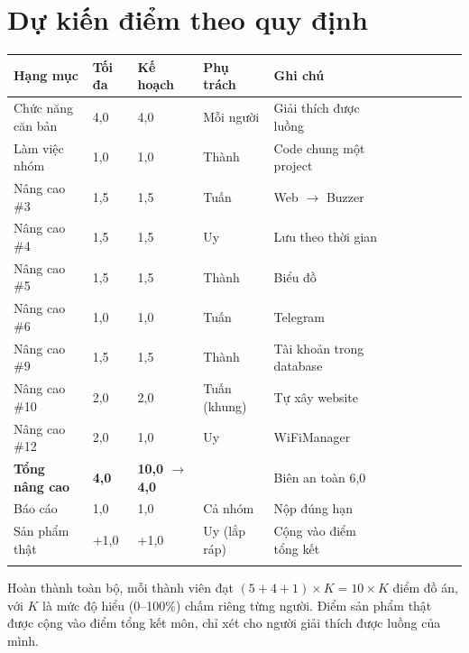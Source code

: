 \documentclass[12pt,a4paper]{article}
\newcommand{\outerline}{\Xhline{0.9pt}}
\begin{document}
\noindent\begin{minipage}{\linewidth}
\setlength{\parskip}{6pt}
\section{Dự kiến điểm theo quy định}
\begin{center}
\begin{tabular}{I L{3.9cm} i C{1.2cm} i C{2.2cm} i C{1.8cm} i L{3.0cm} I}
\outerline
\textbf{Hạng mục} & \textbf{Tối đa} & \textbf{Kế hoạch} & \textbf{Phụ trách} & \textbf{Ghi chú} \\
\hline
Chức năng căn bản & 4,0 & 4,0 & Mỗi người & Giải thích được luồng \\
\hline
Làm việc nhóm & 1,0 & 1,0 & Thành & Code chung một project \\
\hline
Nâng cao \#3 & 1,5 & 1,5 & Tuấn & Web $\rightarrow$ Buzzer \\
\hline
Nâng cao \#4 & 1,5 & 1,5 & Uy & Lưu theo thời gian \\
\hline
Nâng cao \#5 & 1,5 & 1,5 & Thành & Biểu đồ \\
\hline
Nâng cao \#6 & 1,0 & 1,0 & Tuấn & Telegram \\
\hline
Nâng cao \#9 & 1,5 & 1,5 & Thành & Tài khoản trong database \\
\hline
Nâng cao \#10 & 2,0 & 2,0 & Tuấn (khung) & Tự xây website \\
\hline
Nâng cao \#12 & 2,0 & 1,0 & Uy & WiFiManager \\
\hline
\textbf{Tổng nâng cao} & \textbf{4,0} & \textbf{10,0 $\rightarrow$ 4,0} & & Biên an toàn 6,0 \\
\hline
Báo cáo & 1,0 & 1,0 & Cả nhóm & Nộp đúng hạn \\
\hline
Sản phẩm thật & +1,0 & +1,0 & Uy (lắp ráp) & Cộng vào điểm tổng kết \\
\outerline
\end{tabular}
\end{center}

Hoàn thành toàn bộ, mỗi thành viên đạt $(5 + 4 + 1) \times K = 10 \times K$ điểm đồ án, với $K$ là mức độ hiểu (0--100\%) chấm riêng từng người. Điểm sản phẩm thật được cộng vào điểm tổng kết môn, chỉ xét cho người giải thích được luồng của mình.
\end{minipage}
\par\bigskip
\end{document}
